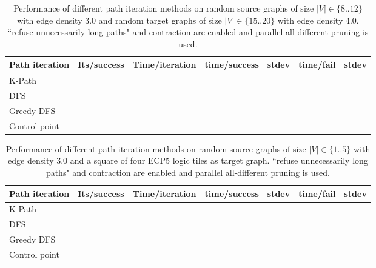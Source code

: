 \begin{table}[ht]
\centering
\begin{tabular}{|l|l|l|l|l|l|l|}
\hline
\textbf{Path iteration} &
  \textbf{Its/success} &
  \textbf{Time/iteration} &
  \textbf{time/success} &
  \textbf{stdev} &
  \textbf{time/fail} &
  \textbf{stdev} \\ \hline
K-Path        &  &  &  &  &  &  \\ \hline
DFS           &  &  &  &  &  &  \\ \hline
Greedy DFS    &  &  &  &  &  &  \\ \hline
Control point &  &  &  &  &  &  \\ \hline
\end{tabular}
\caption{Performance of different path iteration methods on random source graphs of size $|V|\in \{8..12\}$ with edge density 3.0 and random target graphs of size $|V|\in \{15..20\}$ with edge density 4.0. ``refuse unnecessarily long paths" and contraction are enabled and parallel all-different pruning is used.}
\label{tab:iterator-performance}
\end{table}




\begin{table}[ht]
\centering
\begin{tabular}{|l|l|l|l|l|l|l|}
\hline
\textbf{Path iteration} &
  \textbf{Its/success} &
  \textbf{Time/iteration} &
  \textbf{time/success} &
  \textbf{stdev} &
  \textbf{time/fail} &
  \textbf{stdev} \\ \hline
K-Path        &  &  &  &  &  &  \\ \hline
DFS           &  &  &  &  &  &  \\ \hline
Greedy DFS    &  &  &  &  &  &  \\ \hline
Control point &  &  &  &  &  &  \\ \hline
\end{tabular}
\caption{Performance of different path iteration methods on random source graphs of size $|V|\in \{1..5\}$ with edge density 3.0 and a square of four ECP5 logic tiles as target graph. ``refuse unnecessarily long paths" and contraction are enabled and parallel all-different pruning is used.}
\label{tab:iterator-performance}
\end{table}

